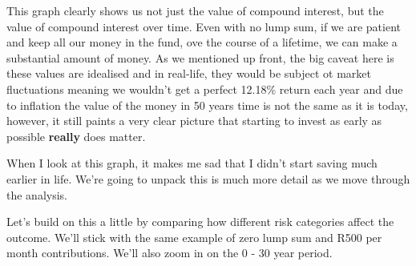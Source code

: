 \documentclass[11pt]{article}
\begin{document}
    This graph clearly shows us not just the value of compound interest, but
the value of compound interest over time. Even with no lump sum, if we
are patient and keep all our money in the fund, ove the course of a
lifetime, we can make a substantial amount of money. As we mentioned up
front, the big caveat here is these values are idealised and in
real-life, they would be subject ot market fluctuations meaning we
wouldn't get a perfect 12.18\% return each year and due to inflation the
value of the money in 50 years time is not the same as it is today,
however, it still paints a very clear picture that starting to invest as
early as possible \textbf{really} does matter.

When I look at this graph, it makes me sad that I didn't start saving
much earlier in life. We're going to unpack this is much more detail as
we move through the analysis.

Let's build on this a little by comparing how different risk categories
affect the outcome. We'll stick with the same example of zero lump sum
and R500 per month contributions. We'll also zoom in on the 0 - 30 year
period.
\end{document}
